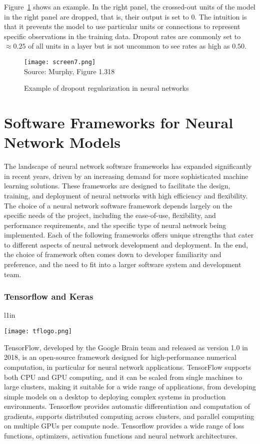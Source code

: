 Figure~\ref{fig:screen7} shows an example. In the right panel, the crossed-out units of the model in the right panel are dropped, that is, their output is set to 0. The intuition is that it prevents the model to use particular units or connections to represent specific observations in the training data. Dropout rates are commonly set to $\approx 0.25$ of all units in a layer but is not uncommon to see rates as high as $0.50$.

\begin{figure}
\centering
\texttt{[image: screen7.png]} \\

\scriptsize Source: Murphy, Figure 1.318
\caption{Example of dropout regularization in neural networks}
\label{fig:screen7}
\end{figure}

\section{Software Frameworks for Neural Network Models}

The landscape of neural network software frameworks has expanded significantly in recent years, driven by an increasing demand for more sophisticated machine learning solutions. These frameworks are designed to facilitate the design, training, and deployment of neural networks with high efficiency and flexibility. The choice of a neural network software framework depends largely on the specific needs of the project, including the ease-of-use, flexibility, and performance requirements, and the specific type of neural network being implemented. Each of the following frameworks offers unique strengths that cater to different aspects of neural network development and deployment. In the end, the choice of framework often comes down to developer familiarity and preference, and the need to fit into a larger software system and development team.

\subsubsection*{Tensorflow and Keras}

\begin{wrapfigure}{l}{1in}
\begin{center}
\texttt{[image: tflogo.png]}
\end{center}
\end{wrapfigure}
TensorFlow, developed by the Google Brain team and released as version 1.0 in 2018, is an open-source framework designed for high-performance numerical computation, in particular for neural network applications. TensorFlow supports both CPU and GPU computing, and it can be scaled from single machines to large clusters, making it suitable for a wide range of applications, from developing simple models on a desktop to deploying complex systems in production environments. Tensorflow provides automatic differentiation and computation of gradients, supports distributed computing across clusters, and parallel computing on multiple GPUs per compute node. Tensorflow provides a wide range of loss functions, optimizers, activation functions and neural network architectures.

